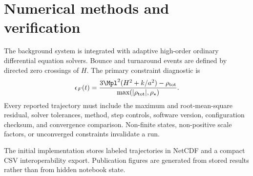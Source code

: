 \section{Numerical methods and verification}
\label{sec:numerics}

The background system is integrated with adaptive high-order ordinary differential equation solvers. Bounce and turnaround events are defined by directed zero crossings of $H$. The primary constraint diagnostic is
\begin{equation}
\epsilon_F(t)=\frac{3\Mpl^2(H^2+k/a^2)-\rho_{\mathrm{tot}}}
{\max(|\rho_{\mathrm{tot}}|,\rho_\star)}.
\end{equation}
Every reported trajectory must include the maximum and root-mean-square residual, solver tolerances, method, step controls, software version, configuration checksum, and convergence comparison. Non-finite states, non-positive scale factors, or unconverged constraints invalidate a run.

The initial implementation stores labeled trajectories in NetCDF and a compact CSV interoperability export. Publication figures are generated from stored results rather than from hidden notebook state.
